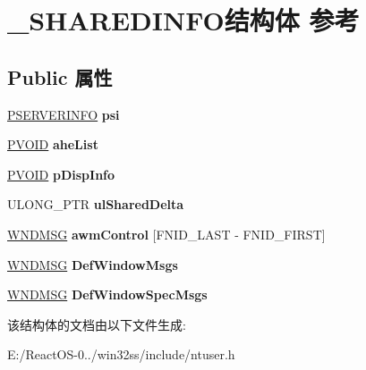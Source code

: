 \hypertarget{struct___s_h_a_r_e_d_i_n_f_o}{}\section{\+\_\+\+S\+H\+A\+R\+E\+D\+I\+N\+F\+O结构体 参考}
\label{struct___s_h_a_r_e_d_i_n_f_o}
\subsection*{Public 属性}
\begin{DoxyCompactItemize}
\item 
\mbox{\label{struct___s_h_a_r_e_d_i_n_f_o_ad6fb29e88e787878a93bd720bc32f954}} 
\hyperlink{structtag_s_e_r_v_e_r_i_n_f_o}{P\+S\+E\+R\+V\+E\+R\+I\+N\+FO} {\bfseries psi}
\item 
\mbox{\label{struct___s_h_a_r_e_d_i_n_f_o_a5ae20c6d0533de21bbf6c9d675f62a1e}} 
\hyperlink{interfacevoid}{P\+V\+O\+ID} {\bfseries ahe\+List}
\item 
\mbox{\label{struct___s_h_a_r_e_d_i_n_f_o_adb3cc19d793e0926973571b3446c3637}} 
\hyperlink{interfacevoid}{P\+V\+O\+ID} {\bfseries p\+Disp\+Info}
\item 
\mbox{\label{struct___s_h_a_r_e_d_i_n_f_o_af3cfdaff0ce428884b80bd05c1a9c97d}} 
U\+L\+O\+N\+G\+\_\+\+P\+TR {\bfseries ul\+Shared\+Delta}
\item 
\mbox{\label{struct___s_h_a_r_e_d_i_n_f_o_a2ee0a925b06567f9718bcc33805daa56}} 
\hyperlink{struct___w_n_d_m_s_g}{W\+N\+D\+M\+SG} {\bfseries awm\+Control} \mbox{[}F\+N\+I\+D\+\_\+\+L\+A\+ST -\/ F\+N\+I\+D\+\_\+\+F\+I\+R\+ST\mbox{]}
\item 
\mbox{\label{struct___s_h_a_r_e_d_i_n_f_o_ad26d884c4618ec5af04e90632b90bfdf}} 
\hyperlink{struct___w_n_d_m_s_g}{W\+N\+D\+M\+SG} {\bfseries Def\+Window\+Msgs}
\item 
\mbox{\label{struct___s_h_a_r_e_d_i_n_f_o_a381eff1c072e0fb90382828f2a5401c7}} 
\hyperlink{struct___w_n_d_m_s_g}{W\+N\+D\+M\+SG} {\bfseries Def\+Window\+Spec\+Msgs}
\end{DoxyCompactItemize}


该结构体的文档由以下文件生成\+:\begin{DoxyCompactItemize}
\item 
E\+:/\+React\+O\+S-\/0../win32ss/include/ntuser.\+h\end{DoxyCompactItemize}
